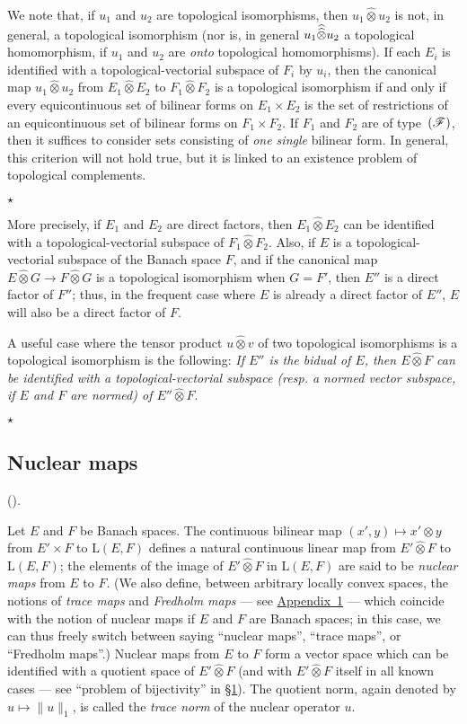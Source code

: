 \documentclass{article}
\theoremstyle{plain}
\newcommand{\aster}[1]{$\star${#1}$\star$}
\newcommand{\LL}{\mathrm{L}}
\newcommand{\FF}{\mbox{\normalfont($\mathscr{F}$)}}
\newcommand{\hotimes}{\widehat{\otimes}}
\newcommand{\hhotimes}{\skew{0}{\widehat}{\skew{0}\widehat{\otimes}}}
\newcommand{\oldpage}[1]{\marginpar{\footnotesize$\Big\vert$ \textit{p.~#1}}}
\begin{document}
We note that, if $u_1$ and $u_2$ are topological isomorphisms, then $u_1\hotimes u_2$ is not, in general, a topological isomorphism (nor is, in general $u_1\hhotimes u_2$ a topological homomorphism, if $u_1$ and $u_2$ are \emph{onto} topological homomorphisms).
If each $E_i$ is identified with a topological-vectorial subspace of $F_i$ by $u_i$, then the canonical map $u_1\hotimes u_2$ from $E_1\hotimes E_2$ to $F_1\hotimes F_2$ is a topological isomorphism if and only if every equicontinuous set of bilinear forms on $E_1\times E_2$ is the set of restrictions of an equicontinuous set of bilinear forms on $F_1\times F_2$.
If $F_1$
\oldpage{85}
and $F_2$ are of type~$\FF$, then it suffices to consider sets consisting of \emph{one single} bilinear form.
In general, this criterion will not hold true, but it is linked to an existence problem of topological complements.

\aster{
  More precisely, if $E_1$ and $E_2$ are direct factors, then $E_1\hotimes E_2$ can be identified with a topological-vectorial subspace of $F_1\hotimes F_2$.
  Also, if $E$ is a topological-vectorial subspace of the Banach space $F$, and if the canonical map $E\hotimes G\to F\hotimes G$ is a topological isomorphism when $G=F'$, then $E''$ is a direct factor of $F''$;
  thus, in the frequent case where $E$ is already a direct factor of $E''$, $E$ will also be a direct factor of $F$.

  A useful case where the tensor product $u\hotimes v$ of two topological isomorphisms is a topological isomorphism is the following:
  \emph{If $E''$ is the bidual of $E$, then $E\hotimes F$ can be identified with a topological-vectorial subspace (resp. a normed vector subspace, if $E$ and $F$ are normed) of $E''\hotimes F$}.
}


\subsection{Nuclear maps}
\label{1.7}

(\cite[chap.~1, \S3, n\textsuperscript{o}~2]{PTT}).
\medskip

Let $E$ and $F$ be Banach spaces.
The continuous bilinear map $(x',y)\mapsto x'\otimes y$ from $E'\times F$ to $\LL(E,F)$ defines a natural continuous linear map from $E'\hotimes F$ to $\LL(E,F)$;
the elements of the image of $E'\hotimes F$ in $\LL(E,F)$ are said to be \emph{nuclear maps} from $E$ to $F$.
(We also define, between arbitrary locally convex spaces, the notions of \emph{trace maps} and \emph{Fredholm maps} --- see \hyperref[appendix1]{Appendix~1} --- which coincide with the notion of nuclear maps if $E$ and $F$ are Banach spaces; in this case, we can thus freely switch between saying ``nuclear maps'', ``trace maps'', or ``Fredholm maps''.)
Nuclear maps from $E$ to $F$ form a vector space which can be identified with a quotient space of $E'\hotimes F$ (and with $E'\hotimes F$ itself in all known cases --- see ``problem of bijectivity'' in \hyperref[1]{\S1}).
The quotient norm, again denoted by $u\mapsto\|u\|_1$, is called the \emph{trace norm} of the nuclear operator $u$.
\end{document}
